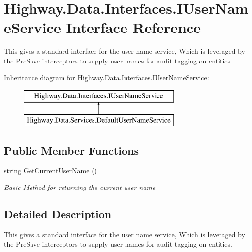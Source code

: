 \hypertarget{interface_highway_1_1_data_1_1_interfaces_1_1_i_user_name_service}{\section{Highway.\-Data.\-Interfaces.\-I\-User\-Name\-Service Interface Reference}
\label{interface_highway_1_1_data_1_1_interfaces_1_1_i_user_name_service}
}


This gives a standard interface for the user name service, Which is leveraged by the Pre\-Save interceptors to supply user names for audit tagging on entities.  


Inheritance diagram for Highway.\-Data.\-Interfaces.\-I\-User\-Name\-Service\-:\begin{figure}[H]
\begin{center}
\leavevmode
\includegraphics[height=2.000000cm]{interface_highway_1_1_data_1_1_interfaces_1_1_i_user_name_service}
\end{center}
\end{figure}
\subsection*{Public Member Functions}
\begin{DoxyCompactItemize}
\item 
string \hyperlink{interface_highway_1_1_data_1_1_interfaces_1_1_i_user_name_service_acf786ae5696f47b78ec3a77870059c43}{Get\-Current\-User\-Name} ()
\begin{DoxyCompactList}\small\item\em Basic Method for returning the current user name \end{DoxyCompactList}\end{DoxyCompactItemize}


\subsection{Detailed Description}
This gives a standard interface for the user name service, Which is leveraged by the Pre\-Save interceptors to supply user names for audit tagging on entities. 



